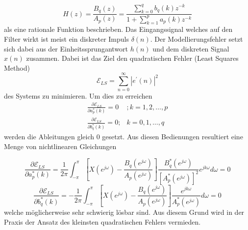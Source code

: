 \begin{equation}
H(z)
=
\frac{B_{q}(z)}{A_{p}(z)}
=
\frac{\sum_{k=0}^{q} b_{q}(k) z^{-k}}{1+\sum_{k=1}^{p} a_{p}(k) z^{-k}}
\end{equation}
als eine rationale Funktion beschrieben.
Das Eingangssignal welches auf den Filter wirkt ist meist ein diskreter Impuls $\delta(n)$.
Der Modellierungsfehler setzt sich dabei aus der Einheitssprungantwort $h(n)$ und dem diskreten Signal $x(n)$ zusammen.
Dabei ist das Ziel den quadratischen Fehler (Least Squares Method)
\begin{equation}
\mathcal{E}_{L S}
=
\sum_{n=0}^{\infty}\left|e^{\prime}(n)\right|^{2}
\end{equation}
des Systems zu minimieren.
Um dies zu erreichen   
\begin{equation}\begin{array}{ll}
\frac{\partial \mathcal{E}_{L S}}{\partial a_{p}^{*}(k)}
=
0 
& 
; k=1,2, \ldots, p \\
\frac{\partial \mathcal{E}_{L S}}{\partial b_{q}^{*}(k)}
=
0 ; 
&
 k=0,1, \ldots, q
\end{array}\end{equation}
werden die Ableitungen gleich 0 gesetzt.
Aus diesen Bedienungen resultiert eine Menge von nichtlinearen Gleichungen 

\begin{equation}
\frac{\partial \mathcal{E}_{L S}}{\partial a_{p}^{*}(k)}
=
\frac{1}{2 \pi} 
\int_{-\pi}^{\pi}
\left[X\left(e^{j \omega}\right)-\frac{B_{q}\left(e^{j \omega}\right)}{A_{p}\left(e^{j \omega}\right)}\right] 
\frac{B_{q}^{*}\left(e^{j \omega}\right)}{\left[A_{p}^{*}\left(e^{j \omega}\right)\right]^{2}} 
e^{j k \omega} d \omega
=
0
\end{equation}
\begin{equation}
\frac{\partial \mathcal{E}_{L S}}{\partial b_{q}^{*}(k)}
=
-\frac{1}{2 \pi} 
\int_{-\pi}^{\pi}
\left[X\left(e^{j \omega}\right)-\frac{B_{q}\left(e^{j \omega}\right)}{A_{p}\left(e^{j \omega}\right)}\right] 
\frac{e^{j k \omega}}{A_{p}^{*}\left(e^{j \omega}\right)} d \omega
=
0
\end{equation}
welche möglicherweise sehr schwierig lösbar sind.
Aus diesem Grund wird in der Praxis der Ansatz des kleinsten quadratischen Fehlers vermieden. 


\begin{figure}
	\centering
	\tikzset{>=latex}
\end{figure}





